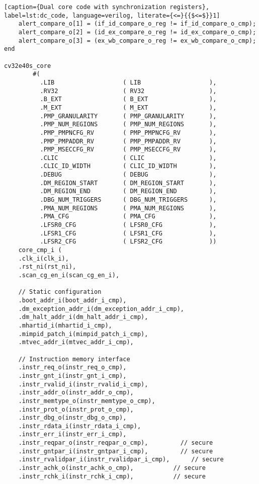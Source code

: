 \begin{lstlisting}[caption={Dual core code with synchronization registers}, label=lst:dc_code, language=verilog, literate={<=}{{$<=$}}1]
    alert_compare_o[1] = (if_id_compare_o_reg != if_id_compare_o_cmp);
    alert_compare_o[2] = (id_ex_compare_o_reg != id_ex_compare_o_cmp);
    alert_compare_o[3] = (ex_wb_compare_o_reg != ex_wb_compare_o_cmp);
end

cv32e40s_core
        #(
          .LIB                   ( LIB                   ),
          .RV32                  ( RV32                  ),
          .B_EXT                 ( B_EXT                 ),
          .M_EXT                 ( M_EXT                 ),
          .PMP_GRANULARITY       ( PMP_GRANULARITY       ),
          .PMP_NUM_REGIONS       ( PMP_NUM_REGIONS       ),
          .PMP_PMPNCFG_RV        ( PMP_PMPNCFG_RV        ),
          .PMP_PMPADDR_RV        ( PMP_PMPADDR_RV        ),
          .PMP_MSECCFG_RV        ( PMP_MSECCFG_RV        ),
          .CLIC                  ( CLIC                  ),
          .CLIC_ID_WIDTH         ( CLIC_ID_WIDTH         ),
          .DEBUG                 ( DEBUG                 ),
          .DM_REGION_START       ( DM_REGION_START       ),
          .DM_REGION_END         ( DM_REGION_END         ),
          .DBG_NUM_TRIGGERS      ( DBG_NUM_TRIGGERS      ),
          .PMA_NUM_REGIONS       ( PMA_NUM_REGIONS       ),
          .PMA_CFG               ( PMA_CFG               ),
          .LFSR0_CFG             ( LFSR0_CFG             ),
          .LFSR1_CFG             ( LFSR1_CFG             ),
          .LFSR2_CFG             ( LFSR2_CFG             ))
    core_cmp_i (
    .clk_i(clk_i),
    .rst_ni(rst_ni),
    .scan_cg_en_i(scan_cg_en_i),

    // Static configuration
    .boot_addr_i(boot_addr_i_cmp),
    .dm_exception_addr_i(dm_exception_addr_i_cmp),
    .dm_halt_addr_i(dm_halt_addr_i_cmp),
    .mhartid_i(mhartid_i_cmp),
    .mimpid_patch_i(mimpid_patch_i_cmp),
    .mtvec_addr_i(mtvec_addr_i_cmp),

    // Instruction memory interface
    .instr_req_o(instr_req_o_cmp),
    .instr_gnt_i(instr_gnt_i_cmp),
    .instr_rvalid_i(instr_rvalid_i_cmp),
    .instr_addr_o(instr_addr_o_cmp),
    .instr_memtype_o(instr_memtype_o_cmp),
    .instr_prot_o(instr_prot_o_cmp),
    .instr_dbg_o(instr_dbg_o_cmp),
    .instr_rdata_i(instr_rdata_i_cmp),
    .instr_err_i(instr_err_i_cmp),
    .instr_reqpar_o(instr_reqpar_o_cmp),         // secure
    .instr_gntpar_i(instr_gntpar_i_cmp),         // secure
    .instr_rvalidpar_i(instr_rvalidpar_i_cmp),      // secure
    .instr_achk_o(instr_achk_o_cmp),           // secure
    .instr_rchk_i(instr_rchk_i_cmp),           // secure


\end{lstlisting}

